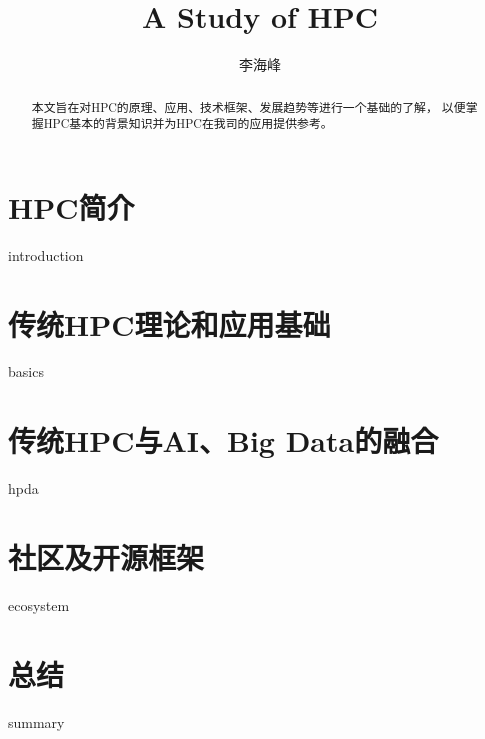 \documentclass{scrartcl}
\title{A Study of HPC}
\author{李海峰}
\begin{document}
\begin{titlingpage}
\maketitle
\begin{abstract}
    本文旨在对HPC的原理、应用、技术框架、发展趋势等进行一个基础的了解，
    以便掌握HPC基本的背景知识并为HPC在我司的应用提供参考。
    
\end{abstract}
\end{titlingpage}
\tableofcontents

\section{HPC简介}
{introduction}

\section{传统HPC理论和应用基础}
{basics}

\section{传统HPC与AI、Big Data的融合}
{hpda}

\section{社区及开源框架}
{ecosystem}

\section{总结}
{summary}

\clearpage
\printbibliography 
\end{document}
